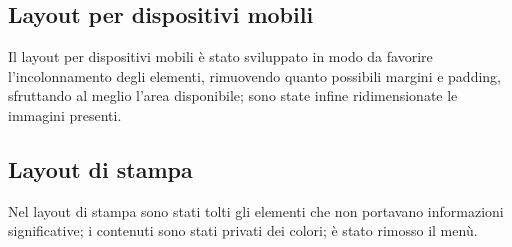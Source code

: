 {	\subsection{Layout per dispositivi mobili}{
		Il layout per dispositivi mobili è stato sviluppato in modo da favorire l'incolonnamento degli elementi, rimuovendo quanto possibili margini e padding, sfruttando al meglio l'area disponibile; sono state infine ridimensionate le immagini presenti.
	}
	\subsection{Layout di stampa}{
		Nel layout di stampa sono stati tolti gli elementi che non portavano informazioni significative; i contenuti sono stati privati dei colori; è stato rimosso il menù.
	}
}

